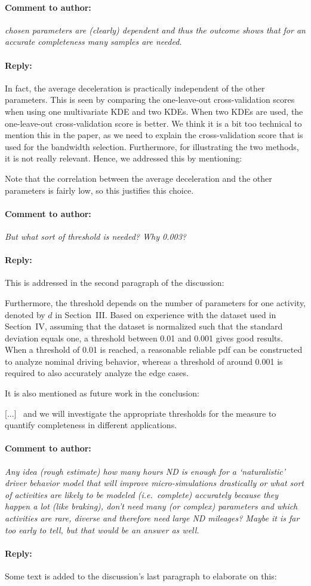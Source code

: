 \documentclass[10pt,final,a4paper,oneside,onecolumn]{article}
\newcommand{\toauthor}{\paragraph*{Comment to author:} \itshape}
\newcommand{\fromauthor}{\paragraph*{Reply:} \normalfont}
\newcommand{\additionend}[1]{\color{black}[#1]\color{red}}
\newcommand{\addition}[1]{\additionend{#1}\ }
\newcommand{\cstart}{\cbstart\color{red}}
\newcommand{\cend}{\cbend\color{black}}
\begin{document}
\toauthor chosen parameters are (clearly) dependent and thus the outcome shows that for an accurate completeness many samples are needed. 

\fromauthor In fact, the average deceleration is practically independent of the other parameters. This is seen by comparing the one-leave-out cross-validation scores when using one multivariate KDE and two KDEs. When two KDEs are used, the one-leave-out cross-validation score is better. We think it is a bit too technical to mention this in the paper, as we need to explain the cross-validation score that is used for the bandwidth selection. Furthermore, for illustrating the two methods, it is not really relevant. Hence, we addressed this by mentioning: 

\cstart
Note that the correlation between the average deceleration and the other parameters is fairly low, so this justifies this choice.
\cend

\toauthor But what sort of threshold is needed? Why 0.003? 

\fromauthor This is addressed in the second paragraph of the discussion:

\cstart 
Furthermore, the threshold depends on the number of parameters for one activity, denoted by $d$ in Section~III. Based on experience with the dataset used in Section~IV, assuming that the dataset is normalized such that the standard deviation equals one, a threshold between 0.01 and 0.001 gives good results. When a threshold of 0.01 is reached, a reasonable reliable pdf can be constructed to analyze nominal driving behavior, whereas a threshold of around 0.001 is required to also accurately analyze the edge cases.
\cend

It is also mentioned as future work in the conclusion:

\cstart \addition{...} and we will investigate the appropriate thresholds for the measure to quantify completeness in different applications. \cend

\toauthor Any idea (rough estimate) how many hours ND is enough for a `naturalistic' driver behavior model that will improve micro-simulations drastically or what sort of activities are likely to be modeled (i.e.\ complete) accurately because they happen a lot (like braking), don't need many (or complex) parameters and which activities are rare, diverse and therefore need large ND mileages? Maybe it is far too early to tell, but that would be an answer as well. 

\fromauthor Some text is added to the discussion's last paragraph to elaborate on this:
\end{document}
